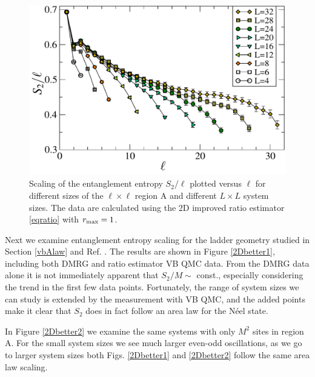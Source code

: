 \begin{figure} {
	\includegraphics[width=5in]{./figures/paper2/fig_AreaL/fig4.pdf} 
	\centering
	\caption[Area law for $S_2$ in the N\'eel state using $L \times L$ systems with periodic boundaries]{
Scaling of the entanglement entropy $S_2/\ell$ plotted versus $\ell$ for different sizes of the $\ell \times \ell$ region A and different $L \times L$ system sizes. 
The data are calculated using the 2D improved ratio estimator \eqref{eqratio} with $r_{\rm max} = 1$.
	\label{2Darea}
	}
} \end{figure}

Next we examine entanglement entropy scaling for the ladder geometry studied in Section \ref{vbAlaw} and Ref. \cite{PRL1}.
The results are shown in Figure \ref{2Dbetter1}, including both DMRG and ratio estimator VB QMC data.  
From the DMRG data alone it is not immediately apparent that $S_2/M \sim$ const., especially considering the trend in the first few data points. 
Fortunately, the range of system sizes we can study is extended by the \swa measurement with VB QMC, and the added points make it clear that $S_2$ does in fact follow an area law for the N\'eel state.

In Figure \ref{2Dbetter2} we examine the same systems with only $M^2$ sites in region A.
For the small system sizes we see much larger even-odd oscillations, as we go to larger system sizes both Figs. \ref{2Dbetter1} and \ref{2Dbetter2} follow the same area law scaling.


